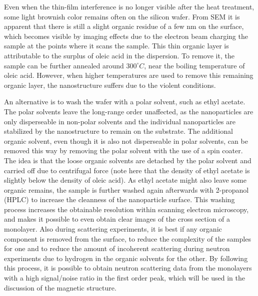\documentclass[\main/dresen_thesis.tex]{subfiles}
\begin{document}
  \label{sec:monolayers:preparation:cleaningWafers}
  Even when the thin-film interference is no longer visible after the heat treatment, some light brownish color remains often on the silicon wafer.
  From SEM it is apparent that there is still a slight organic residue of a few nm on the surface, which becomes visible by imaging effects due to the electron beam charging the sample at the points where it scans the sample.
  This thin organic layer is attributable to the surplus of oleic acid in the dispersion.
  To remove it, the sample can be further annealed around $300 ^\circ C$, near the boiling temperature of oleic acid.
  However, when higher temperatures are used to remove this remaining organic layer, the nanostructure suffers due to the violent conditions.

  An alternative is to wash the wafer with a polar solvent, such as ethyl acetate.
  The polar solvents leave the long-range order unaffected, as the nanoparticles are only disperseable in non-polar solvents and the individual nanoparticles are stabilized by the nanostructure to remain on the substrate.
  The additional organic solvent, even though it is also not disperseable in polar solvents, can be removed this way by removing the polar solvent with the use of a spin coater.
  The idea is that the loose organic solvents are detached by the polar solvent and carried off due to centrifugal force (note here that the density of ethyl acetate is slightly below the density of oleic acid).
  As ethyl acetate might also leave some organic remains, the sample is further washed again afterwards with 2-propanol (HPLC) to increase the cleanness of the nanoparticle surface.
  This washing process increases the obtainable resolution within scanning electron microscopy, and makes it possible to even obtain clear images of the cross section of a monolayer.
  Also during scattering experiments, it is best if any organic component is removed from the surface, to reduce the complexity of the samples for one and to reduce the amount of incoherent scattering during neutron experiments due to hydrogen in the organic solvents for the other.
  By following this process, it is possible to obtain neutron scattering data from the monolayers  with a high signal/noise ratio in the first order peak, which will be used in the discussion of the magnetic structure.
\end{document}

